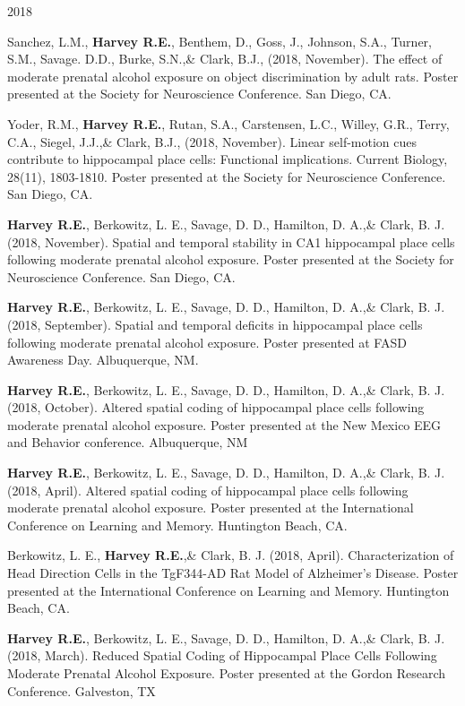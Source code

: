 \begin{cventries}
\cventry
    {} %
    {} %
    {} %
    {2018} %
    {
      \begin{cvitems} %
      \setlength\itemsep{0.4em}
        \item {Sanchez, L.M., \textbf{Harvey R.E.}, Benthem, D., Goss, J., Johnson, S.A., Turner, S.M., Savage. D.D., Burke, S.N.,\& Clark, B.J., (2018, November). The effect of moderate prenatal alcohol exposure on object discrimination by adult rats. Poster presented at the Society for Neuroscience Conference. San Diego, CA.}
        \item {Yoder, R.M., \textbf{Harvey R.E.}, Rutan, S.A., Carstensen, L.C., Willey, G.R., Terry, C.A., Siegel, J.J.,\& Clark, B.J., (2018, November). Linear self-motion cues contribute to hippocampal place cells: Functional implications. Current Biology, 28(11), 1803-1810. Poster presented at the Society for Neuroscience Conference. San Diego, CA.}
        \item {\textbf{Harvey R.E.}, Berkowitz, L. E., Savage, D. D., Hamilton, D. A.,\& Clark, B. J. (2018, November). Spatial and temporal stability in CA1 hippocampal place cells following moderate prenatal alcohol exposure. Poster presented at the Society for Neuroscience Conference. San Diego, CA.}
        \item {\textbf{Harvey R.E.}, Berkowitz, L. E., Savage, D. D., Hamilton, D. A.,\& Clark, B. J. (2018, September). Spatial and temporal deficits in hippocampal place cells following moderate prenatal alcohol exposure. Poster presented at FASD Awareness Day. Albuquerque, NM.}
        \item {\textbf{Harvey R.E.}, Berkowitz, L. E., Savage, D. D., Hamilton, D. A.,\& Clark, B. J. (2018, October). Altered spatial coding of hippocampal place cells following moderate prenatal alcohol exposure. Poster presented at the New Mexico EEG and Behavior conference. Albuquerque, NM}
        \item {\textbf{Harvey R.E.}, Berkowitz, L. E., Savage, D. D., Hamilton, D. A.,\& Clark, B. J. (2018, April). Altered spatial coding of hippocampal place cells following moderate prenatal alcohol exposure. Poster presented at the International Conference on Learning and Memory. Huntington Beach, CA.}
        \item {Berkowitz, L. E., \textbf{Harvey R.E.},\& Clark, B. J. (2018, April). Characterization of Head Direction Cells in the TgF344-AD Rat Model of Alzheimer’s Disease. Poster presented at the International Conference on Learning and Memory. Huntington Beach, CA.}
        \item {\textbf{Harvey R.E.}, Berkowitz, L. E., Savage, D. D., Hamilton, D. A.,\& Clark, B. J. (2018, March). Reduced Spatial Coding of Hippocampal Place Cells Following Moderate Prenatal Alcohol Exposure. Poster presented at the Gordon Research Conference. Galveston, TX}
      \end{cvitems}
    }
\end{cventries}

